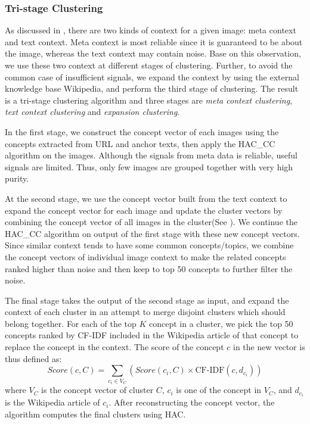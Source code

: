 \subsubsection{Tri-stage Clustering}
As discussed in , there are two kinds of context for a given image:
meta context and text context. Meta context is most reliable since it is guaranteed to be
about the image, whereas the text context may contain noise. Base on this observation,
we use these two context at different stages of clustering. Further,
to avoid the common case of insufficient signals, we expand the context by
using the external knowledge base Wikipedia, and perform the third stage of clustering.
The result is a tri-stage clustering algorithm and three stages are {\em meta context clustering},
{\em text context clustering} and {\em expansion clustering}.

In the first stage, we construct the concept vector of each images
using the concepts extracted from URL and anchor texts,
then apply the HAC\_CC algorithm on the images. Although the signals
from meta data is reliable, useful signals are limited.
Thus, only few images are grouped together with very high purity.

At the second stage, we use the concept vector built from the text context to
expand the concept vector for each image and update the cluster vectors
by combining the concept vector of all images in the cluster(See ).
We continue the HAC\_CC algorithm on output of the first stage with these
new concept vectors. Since similar context tends to have some common concepts/topics,
we combine the concept vectors of individual image context to make the related concepts
ranked higher than noise and then keep to top 50 concepts to further filter the noise.

The final stage takes the output of the second stage as input, and expand the
context of each cluster in an attempt to merge disjoint clusters which should 
belong together.
For each of the top $K$ concept in a cluster, we pick the top 50 concepts ranked
by CF-IDF included in the Wikipedia article of that concept to replace the concept
in the context.  The score of the concept $c$ in the new vector is thus defined as:
\begin{equation}
\label{expv}
Score(c, C)=\sum_{c_i\in V_C}\left({Score(c_i, C) \times \mbox{CF-IDF}(c, d_{c_i})}\right)
\end{equation}
where $V_C$ is the concept vector of cluster $C$, $c_i$ is one of the concept in
$V_C$, and $d_{c_i}$ is the Wikipedia article of $c_i$.
After reconstructing the concept vector,
the algorithm computes the final clusters using HAC.

